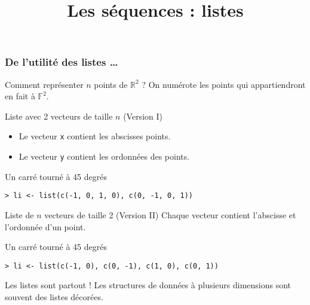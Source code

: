 \documentclass[10pt]{beamer}
\title{Les séquences : listes}
\begin{document}
\maketitle



\begin{frame}[fragile]
  \frametitle{De l’utilité des listes \dots}
  
  \begin{exampleblock}{Comment représenter $n$ points de $\mathbb{R}^2$ ?}
    On numérote les points qui appartiendront en fait à $\mathbb{F}^2$. 
  \end{exampleblock}

 \begin{block}{Liste avec 2 vecteurs de taille $n$ (Version I)}
      \begin{itemize}
      \item Le vecteur \texttt{x} contient les abscisses points.
      \item Le vecteur \texttt{y} contient les ordonnées des points.
      \end{itemize}
 \end{block}

  \begin{exampleblock}{Un carré tourné à 45 degrés}
   \begin{lstlisting}[style=block]
> li <- list(c(-1, 0, 1, 0), c(0, -1, 0, 1)) 
   \end{lstlisting}   
 \end{exampleblock}

 \begin{block}{Liste de $n$ vecteurs de taille 2 (Version II)}
   Chaque vecteur contient l'abscisse et l'ordonnée d'un point.
 \end{block}

  \begin{exampleblock}{Un carré tourné à 45 degrés}
   \begin{lstlisting}[style=block]
> li <- list(c(-1, 0), c(0, -1), c(1, 0), c(0, 1)) 
   \end{lstlisting}   
 \end{exampleblock}


 
  \begin{alertblock}{Les listes sont partout !}
    Les structures de données à plusieurs dimensions sont souvent des listes décorées.
  \end{alertblock}
    
\end{frame}
\end{document}
